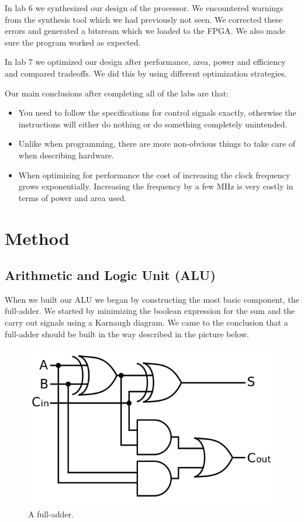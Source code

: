 \documentclass[a4paper,11pt]{article}
\begin{document}
In lab 6 we synthesized our design of the processor. We encountered warnings from the synthesis tool which we had previously not seen. We corrected these errors and generated a bitsream which we loaded to the FPGA. We also made sure the program worked as expected.

In lab 7 we optimized our design after performance, area, power and efficiency and compared tradeoffs. We did this by using different optimization strategies.

Our main conclusions after completing all of the labs are that:
\begin{itemize}
	\item You need to follow the specifications for control signals exactly, otherwise the instructions will either do nothing or do something completely unintended. 
	\item Unlike when programming, there are more non-obvious things to take care of when describing hardware.
	\item When optimizing for performance the cost of increasing the clock frequency grows exponentially. Increasing the frequency by a few MHz is very costly in terms of power and area used. 
\end{itemize}

\newpage
\section{Method}
\subsection{Arithmetic and Logic Unit (ALU)}

When we built our ALU we began by constructing the most basic component, the full-adder. We started by minimizing the boolean expression for the sum and the carry out signals using a Karnaugh diagram. We came to the conclusion that a full-adder should be built in the way described in the picture below.

\begin{figure}[h!]
  \centering
  \includegraphics[width=0.5\linewidth]{fulladder.png}
  \caption{A full-adder.}
  \label{fig:etikett}
\end{figure}
\end{document}
